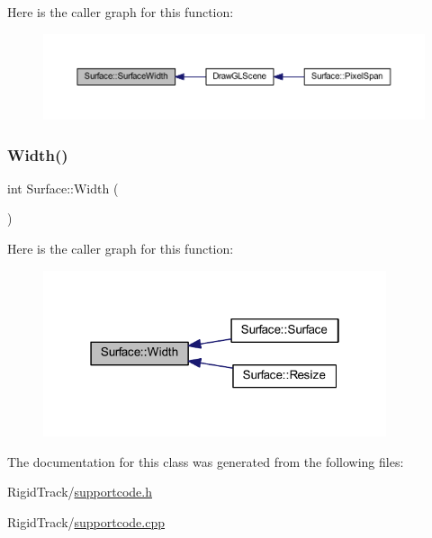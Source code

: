 Here is the caller graph for this function\+:
\nopagebreak
\begin{figure}[H]
\begin{center}
\leavevmode
\includegraphics[width=350pt]{class_surface_a4cbf23ea0c8ff533271109fc2a1a863d_icgraph}
\end{center}
\end{figure}
\mbox{\label{class_surface_ae76d7c2fa208df6979a77cc60e8105c0}} 
\subsubsection{\texorpdfstring{Width()}{Width()}}
{\footnotesize\ttfamily int Surface\+::\+Width (\begin{DoxyParamCaption}{ }\end{DoxyParamCaption})\hspace{0.3cm}{\ttfamily [inline]}}

Here is the caller graph for this function\+:
\nopagebreak
\begin{figure}[H]
\begin{center}
\leavevmode
\includegraphics[width=286pt]{class_surface_ae76d7c2fa208df6979a77cc60e8105c0_icgraph}
\end{center}
\end{figure}


The documentation for this class was generated from the following files\+:\begin{DoxyCompactItemize}
\item 
Rigid\+Track/\hyperlink{supportcode_8h}{supportcode.\+h}\item 
Rigid\+Track/\hyperlink{supportcode_8cpp}{supportcode.\+cpp}\end{DoxyCompactItemize}
